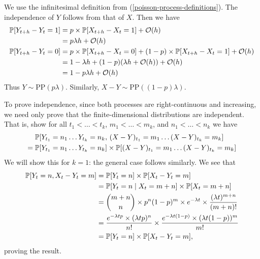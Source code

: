 \documentclass{article}
\begin{document}
\begin{prf}
    We use the infinitesimal definition from (\ref{poisson-process-definitions}). The independence of $Y$ follows from that of $X$. Then we have
    \begin{align*}
    	\P[Y_{t+h} - Y_t = 1] &= p \times \P[X_{t+h} - X_t = 1] + \calO(h) \\
    	&= p \lambda h + \calO(h) \\
    	\P[Y_{t+h} - Y_t = 0] &= p \times \P[X_{t+h} - X_t = 0] + (1-p) \times \P[X_{t+h} - X_t = 1] + \calO(h) \\
    	&= 1 - \lambda h + (1-p)(\lambda h + \calO(h)) + \calO(h) \\
    	&= 1 - p \lambda h + \calO(h)
	\end{align*}
	Thus $Y \sim \mathrm{PP}(p\lambda)$. Similarly, $X - Y \sim \mathrm{PP}((1-p)\lambda)$.
	
	To prove independence, since both processes are right-continuous and increasing, we need only prove that the finite-dimensional distributions are independent. That is, show for all $t_1 < \dots < t_k$, $m_1 < \dots < m_k$, and $n_1 < \dots < n_k$ we have
	\begin{align*}
    	& \P[Y_{t_1} = n_1 \dots Y_{t_k} = n_k, \, (X-Y)_{t_1} = m_1 \dots (X-Y)_{t_k} = m_k] \\
    	= \; &\P[Y_{t_1} = n_1 \dots Y_{t_k} = n_k] \times \P[(X-Y)_{t_1} = m_1 \dots (X-Y)_{t_k} = m_k]
	\end{align*}
	We will show this for $k=1$: the general case follows similarly. We see that
	\begin{align*}
    	\P[Y_t = n, X_t - Y_t = m] &= \P[Y_t = n] \times \P[X_t - Y_t = m] \\
    	&= \P[Y_t = n \mid X_t = m+n] \times \P[X_t = m + n] \\
    	&= \binom{m+n}{n} \times p^n (1-p)^m \times e^{-\lambda t} \times \frac{(\lambda t)^{m+n}}{(m+n)!} \\
    	&= \frac{e^{-\lambda t p} \times (\lambda t p)^n}{n!} \times \frac{e^{-\lambda t (1-p)} \times (\lambda t (1-p))^m}{m!} \\
    	&= \P[Y_t = n] \times \P[X_t - Y_t = m],
	\end{align*}
	proving the result.
\end{prf}
\end{document}
